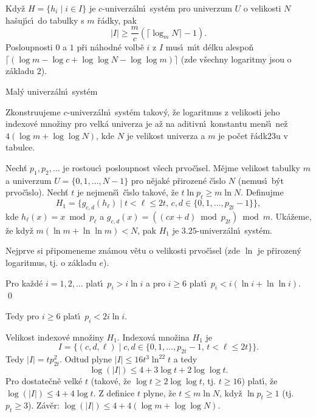 Kdy\v z $H=\{h_i\mid i\in I\}$ je $c$-univerz\'aln\'\i\ syst\'em pro 
univerzum $U$ o velikosti $N$ ha\v suj\'\i c\'\i\ do tabulky s $m$ \v r\'adky, pak 
$$|I|\ge\frac mc(\lceil\log_mN\rceil -1).$$
Posloupnosti $0$ a $1$ p\v ri n\'ahodn\'e volb\v e $i$ z $I$ mus\'\i\ m\'\i t 
d\'elku alespo\v n $\lceil (\log m-\log c+\log\log N-\log\log m)\rceil$ (zde v\v sechny logaritmy 
jsou o z\'akladu $2$).
\endproclaim
\medskip

\subhead
Mal\'y univerz\'aln\'\i\ syst\'em
\endsubhead
\smallskip

\flushpar Zkonstruujeme $c$-univerz\'aln\'\i\ syst\'em takov\'y, 
\v ze logaritmus z velikosti jeho indexov\'e mno\v ziny pro velk\'a 
univerza je a\v z na aditivn\'\i\ konstantu men\v s\'\i\ ne\v z 
$4(\log m+\log\log N)$, kde $N$ je velikost univerza a $m$ je po\v cet 
\v r\'adk\accent23u v tabulce.  
\medskip

\flushpar Nech\v t $p_1,p_2,\dots$ je rostouc\'\i\ posloupnost v\v sech 
prvo\v c\'\i sel. M\v ej\-me velikost tabulky $m$ a univerzum $U=\{0,1,\dots,N-1\}$ pro 
n\v ejak\'e p\v rirozen\'e \v c\'\i slo $N$ (nemus\'\i\ b\'yt prvo\v c\'\i slo). Nech\v t $t$ je 
nejmen\v s\'\i\ \v c\'\i slo takov\'e, \v ze $t\ln p_t\ge m\ln N$. Definujme 
$$H_1=\{g_{c,d}(h_{\ell})\mid t<\ell\le 2t,\,c,d\in \{0,1,\dots,p_{
2t}-1\}\},$$
kde $h_{\ell}(x)=x\bmod p_{\ell}$ a 
$g_{c,d}(x)=((cx+d)\bmod p_{2t})\bmod m$.\newline 
Uk\'a\v zeme, \v ze kdy\v z $m(\ln m+\ln\ln m)<N$, pak $H_1$ je $3.25$-univerz\'aln\'\i\ syst\'em. 
\medskip

\flushpar Nejprve si p\v ripomeneme zn\'amou v\v etu o velikosti prvo\v c\'\i sel 
(zde $\ln$ je p\v rirozen\'y logaritmus, tj. o z\'akladu $e$).

Pro ka\v zd\'e $i=1,2,\dots$ plat\'\i\ $p_i>i\ln 
i$ a pro $i\ge 6$ 
plat\'\i\ $p_i<i(\ln i+\ln\ln i)$. \qed
\endproclaim

\flushpar Tedy pro $i\ge 6$ plat\'\i\ $p_i<2i\ln i$.
\medskip

\flushpar Velikost indexov\'e mno\v ziny $H_1$.  Indexov\'a mno\v zina $
H_1$ je 
$$I=\{(c,d,\ell )\mid c,d\in \{0,1,\dots,p_{2t}-1,\,t<\ell\le 2t\}\}.$$  
Tedy $
|I|=tp_{2t}^2$.   
Odtud plyne $|I|\le 16t^3\ln^22t$ a tedy 
$$\log(|I|)\le 4+3\log t+2\log\log t.$$
Pro dostate\v cn\v e velk\'e $t$ (takov\'e, \v ze $\log t\ge 2\log\log 
t$, tj. $t\ge 16$) plat\'\i , 
\v ze $\log(|I|)\le 4+4\log t$.  Z definice $t$ plyne, 
\v ze $t\le m\ln N$, kdy\v z $\ln p_t\ge 1$ (tj.  $p_t\ge 3$).\newline 
Z\'av\v er: $\log(|I|)\le 4+4(\log m+\log\log N)$. 
\medskip

